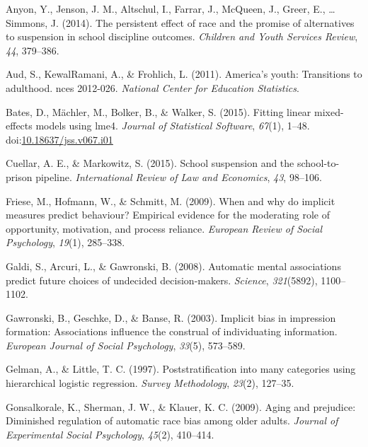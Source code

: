\documentclass[english,floatsintext,man]{apa6}
\theoremstyle{definition}
\theoremstyle{definition}
\theoremstyle{remark}
\begin{document}
\setlength{\parindent}{-0.5in} \setlength{\leftskip}{0.5in}

\hypertarget{refs}{}
\hypertarget{ref-anyon2014persistent}{}
Anyon, Y., Jenson, J. M., Altschul, I., Farrar, J., McQueen, J., Greer,
E., \ldots{} Simmons, J. (2014). The persistent effect of race and the
promise of alternatives to suspension in school discipline outcomes.
\emph{Children and Youth Services Review}, \emph{44}, 379--386.

\hypertarget{ref-aud2011america}{}
Aud, S., KewalRamani, A., \& Frohlich, L. (2011). America's youth:
Transitions to adulthood. nces 2012-026. \emph{National Center for
Education Statistics}.

\hypertarget{ref-bates2015fitting}{}
Bates, D., Mächler, M., Bolker, B., \& Walker, S. (2015). Fitting linear
mixed-effects models using lme4. \emph{Journal of Statistical Software},
\emph{67}(1), 1--48.
doi:\href{https://doi.org/10.18637/jss.v067.i01}{10.18637/jss.v067.i01}

\hypertarget{ref-cuellar2015school}{}
Cuellar, A. E., \& Markowitz, S. (2015). School suspension and the
school-to-prison pipeline. \emph{International Review of Law and
Economics}, \emph{43}, 98--106.

\hypertarget{ref-friese2009and}{}
Friese, M., Hofmann, W., \& Schmitt, M. (2009). When and why do implicit
measures predict behaviour? Empirical evidence for the moderating role
of opportunity, motivation, and process reliance. \emph{European Review
of Social Psychology}, \emph{19}(1), 285--338.

\hypertarget{ref-galdi2008automatic}{}
Galdi, S., Arcuri, L., \& Gawronski, B. (2008). Automatic mental
associations predict future choices of undecided decision-makers.
\emph{Science}, \emph{321}(5892), 1100--1102.

\hypertarget{ref-gawronski2003implicit}{}
Gawronski, B., Geschke, D., \& Banse, R. (2003). Implicit bias in
impression formation: Associations influence the construal of
individuating information. \emph{European Journal of Social Psychology},
\emph{33}(5), 573--589.

\hypertarget{ref-gelman1997poststratification}{}
Gelman, A., \& Little, T. C. (1997). Poststratification into many
categories using hierarchical logistic regression. \emph{Survey
Methodology}, \emph{23}(2), 127--35.

\hypertarget{ref-gonsalkorale2009aging}{}
Gonsalkorale, K., Sherman, J. W., \& Klauer, K. C. (2009). Aging and
prejudice: Diminished regulation of automatic race bias among older
adults. \emph{Journal of Experimental Social Psychology}, \emph{45}(2),
410--414.
\end{document}

